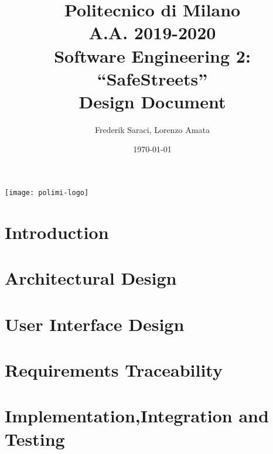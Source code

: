 \documentclass[a4paper]{article}
\author{Frederik Saraci, Lorenzo Amata}
\date{\today}
\title{Politecnico di Milano
	\\A.A. 2019\@-\@2020
	\\Software Engineering 2: ``SafeStreets''
	\\\textbf{D}esign \textbf{D}ocument}
\begin{document}
\maketitle
\begin{center}
	\texttt{[image: polimi-logo]}
\end{center}
\clearpage
\tableofcontents
\clearpage
\section{Introduction}

\clearpage
\section{Architectural Design}

\clearpage
\section{User Interface Design}

\clearpage
\section{Requirements Traceability}

\clearpage
\section{Implementation,Integration and Testing}

\clearpage

\end{document}
